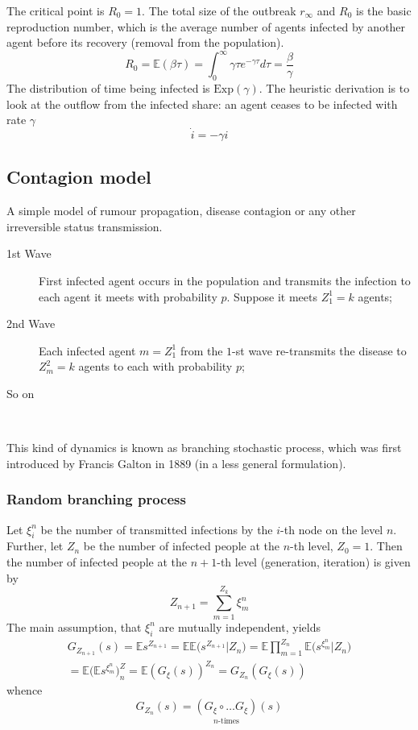 \documentclass[a4paper]{article}
\newcommand{\ex}{\mathbb{E}}
\begin{document}
The critical point is $R_0 = 1$. The total size of the outbreak $r_\infty$ and
$R_0$ is the basic reproduction number, which is the average number of agents
infected by another agent before its recovery (removal from the population).
\[
R_0
= \ex(\beta \tau)
= \int_0^\infty \gamma \tau e^{-\gamma \tau} d\tau
= \frac{\beta}{\gamma}
\]
The distribution of time being infected is $\text{Exp}(\gamma)$. The heuristic
derivation is to look at the outflow from the infected share: an agent ceases to be infected with rate $\gamma$
\[\dot{i} = - \gamma i\]



\subsection{Contagion model} %
\label{sub:contagion_model}

A simple model of rumour propagation, disease contagion or any other
irreversible status transmission. \begin{description}
	\item[1st Wave] First infected agent occurs in the population and
	transmits the infection to each agent it meets with probability $p$.
	Suppose it meets $Z^1_1=k$ agents;
	\item[2nd Wave] Each infected agent $m=Z^1_1$ from the $1$-st wave
	re-transmits the disease to $Z^2_m=k$ agents to each with probability $p$;
	\item[So on] \hfill\\
\end{description}
This kind of dynamics is known as branching stochastic process, which was
first introduced by Francis Galton in 1889 (in a less general formulation).

\subsubsection{Random branching process} %
\label{ssub:random_branching_process}

Let $\xi^n_i$ be the number of transmitted infections by the $i$-th node on
the level $n$. Further, let $Z_n$ be the number of infected people at the
$n$-th level, $Z_0 = 1$. Then the number of infected people at the $n+1$-th
level (generation, iteration) is given by
\[Z_{n+1} = \sum_{m=1}^{Z_k} \xi^n_m\]
The main assumption, that $\xi^n_i$ are mutually independent, yields
\begin{multline*}
G_{Z_{n+1}}(s)
= \ex s^{Z_{n+1}}
= \ex \ex \bigl(s^{Z_{n+1}}\rvert Z_n\bigr)
= \ex \prod_{m=1}^{Z_n} \ex \bigl(s^{\xi^n_m}\rvert Z_n\bigr)\\
= \ex \bigl( \ex s^{\xi^n_m} \bigl)^Z_n
= \ex (G_\xi(s))^{Z_n}
= G_{Z_n}( G_\xi(s) )
\end{multline*}
whence
\[G_{Z_n}(s) = \underset{n\text{-times}}{(G_\xi\circ \ldots G_\xi)}(s)\]
\end{document}
